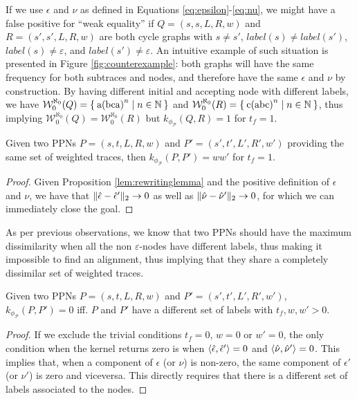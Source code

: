 \begin{example}
	If we use $\epsilon$ and $\nu$ as defined in Equations \ref{eq:epsilon}-\ref{eq:nu}, we might have a false positive for ``weak equality'' if $Q=(s,s,L,R,w)$ and $R=(s',s',L,R,w)$ are both cycle graphs with $s\neq s'$, $\textit{label}(s)\neq\textit{label}(s')$, $\textit{label}(s)\neq\varepsilon$, and $\textit{label}(s')\neq\varepsilon$. An intuitive example of such situation is presented in Figure \ref{fig:counterexample}: both graphs will have the same frequency for both subtraces and nodes, and therefore have the same  $\epsilon$ and $\nu$ by construction. By having different initial and accepting node with  different labels, we have $\mathcal{W}_0^{\aleph_0}(Q)=\Set{\textup{a(bca)}^n|n\in\mathbb{N}}$ and $\mathcal{W}_0^{\aleph_0}(R)=\Set{\textup{c(abc)}^n|n\in\mathbb{N}}$, thus implying $\mathcal{W}_0^{\aleph_0}(Q)=\mathcal{W}_0^{\aleph_0}(R)$ but $k_{\phi_{\mathcal{P}}}(Q,R)=1$ for $t_f=1$.
\end{example}


\begin{lemma}
Given two PPNs $P=(s,t,L,R,w)$ and $P'=(s',t',L',R',w')$ providing the same set of weighted traces, then $k_{\phi_{\mathcal{P}}}(P,P')=ww'$ for $t_f=1$.
\end{lemma}
\begin{proof}
Given Proposition \ref{lem:rewritinglemma} and the positive definition of $\epsilon$ and $\nu$,  we have that $\|\hat{\epsilon}-\hat{\epsilon}'\|_{2}\to 0$ as well as $\|\hat{\nu}-\hat{\nu}'\|_{2}\to 0$, for which we can immediately close the goal.
\end{proof}

As per previous observations, we know that two PPNs should have the maximum dissimilarity when all the non $\varepsilon$-nodes have different labels, thus making it impossible to find an alignment, thus implying that they share a completely dissimilar set of weighted traces.

\begin{lemma}
Given two PPNs $P=(s,t,L,R,w)$ and $P'=(s',t',L',R',w')$, $k_{\phi_{\mathcal{P}}}(P,P')=0$ iff. $P$ and $P'$ have a different set of labels with $t_f,w,w'>0$.
\end{lemma}
\begin{proof}
If we exclude the trivial conditions $t_f=0$, $w=0$ or $w'=0$, the only condition when the kernel returns zero is when  $\Braket{\hat{\epsilon},\hat{\epsilon}'}=0$ and $\Braket{\hat{\nu},\hat{\nu}'}=0$. This implies that, when a component of $\epsilon$ (or $\nu$) is non-zero, the same component of $\epsilon'$ (or $\nu'$) is zero and viceversa. This directly requires that there is a different set of labels associated to the nodes. 
\end{proof}

